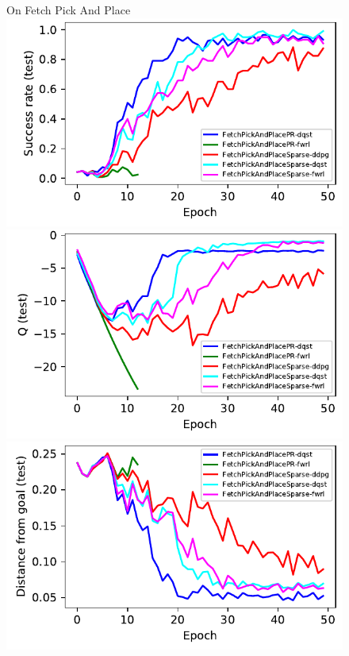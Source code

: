 \begin{figure}
  On Fetch Pick And Place\\
  \includegraphics[width=\frac\columnwidth]{./media/res/d5cefef-path_reward-FetchPickAndPlacePR-v1-dqst/test/success_rate.pdf}%
  \includegraphics[width=\frac\columnwidth]{./media/res/d5cefef-path_reward-FetchPickAndPlacePR-v1-dqst/test/mean_Q.pdf}%
  \includegraphics[width=\frac\columnwidth]{./media/res/d5cefef-path_reward-FetchPickAndPlacePR-v1-dqst/test/ag_g_dist.pdf}%

\end{figure}
